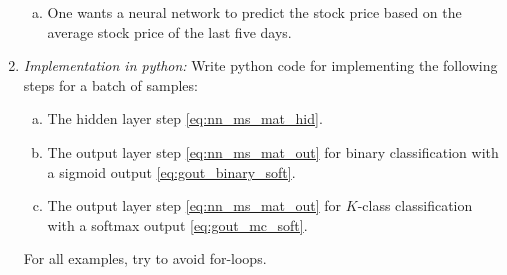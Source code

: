 \documentclass[11pt]{article}
\begin{document}
\begin{enumerate}
\begin{enumerate}[(a)]
\item One wants  a neural network to predict the
stock price based on the average stock price of the last five days.
\end{enumerate}


\item \emph{Implementation in python:}
Write python code for implementing the following steps for a batch of samples:
\begin{enumerate}[(a)]
\item The hidden layer step \eqref{eq:nn_ms_mat_hid}.
\item The output layer step \eqref{eq:nn_ms_mat_out}
for binary classification with a sigmoid output \eqref{eq:gout_binary_soft}.
\item The output layer step \eqref{eq:nn_ms_mat_out}
for $K$-class classification with a softmax output \eqref{eq:gout_mc_soft}.
\end{enumerate}
For all examples, try to avoid for-loops.
\end{enumerate}
\end{document}

